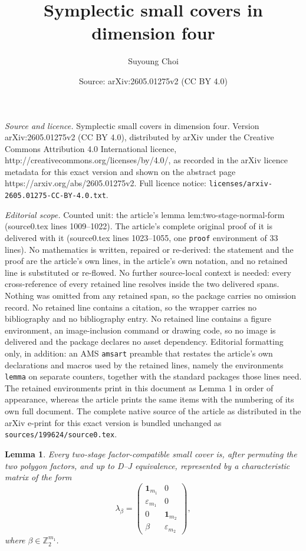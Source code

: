 \documentclass[10pt,a4paper]{amsart}
\title{Symplectic small covers in dimension four}
\author{Suyoung Choi}
\date{Source: arXiv:2605.01275v2 (CC BY 4.0)}
\newtheorem{lemma}{Lemma}
\newcommand{\Z}{\mathbb Z}
\newcommand{\one}{\mathbf 1}
\begin{document}
\maketitle

\noindent\emph{Source and licence.} Symplectic small covers in dimension four. Version arXiv:2605.01275v2 (CC BY 4.0), distributed by arXiv under the Creative Commons Attribution 4.0 International licence, http://creativecommons.org/licenses/by/4.0/, as recorded in the arXiv licence metadata for this exact version and shown on the abstract page https://arxiv.org/abs/2605.01275v2. Full licence notice: \texttt{licenses/arxiv-2605.01275-CC-BY-4.0.txt}.\par\smallskip

\noindent\textit{Editorial scope.} Counted unit: the article's lemma lem:two-stage-normal-form (source0.tex lines 1009--1022). The article's complete original proof of it is delivered with it (source0.tex lines 1023--1055, one \texttt{proof} environment of 33 lines). No mathematics is written, repaired or re-derived: the statement and the proof are the article's own lines, in the article's own notation, and no retained line is substituted or re-flowed.  No further source-local context is needed: every cross-reference of every retained line resolves inside the two delivered spans.  Nothing was omitted from any retained span, so the package carries no omission record.  No retained line contains a citation, so the wrapper carries no bibliography and no bibliography entry.  No retained line contains a figure environment, an image-inclusion command or drawing code, so no image is delivered and the package declares no asset dependency.  Editorial formatting only, in addition: an AMS \texttt{amsart} preamble that restates the article's own declarations and macros used by the retained lines, namely the environments \texttt{lemma} on separate counters, together with the standard packages those lines need.  The retained environments print in this document as Lemma 1 in order of appearance, whereas the article prints the same items with the numbering of its own full document.  The complete native source of the article as distributed in the arXiv e-print for this exact version is bundled unchanged as \texttt{sources/199624/source0.tex}.
\begin{lemma}\label{lem:two-stage-normal-form}
    Every two-stage factor-compatible small cover is, after permuting the two polygon factors, and up to
    D--J equivalence, represented by a characteristic matrix of the form
    \begin{equation}\label{eq:two-stage-normal-form}
        \lambda_\beta=
        \begin{pmatrix}
            \one_{m_1} & 0\\
            \varepsilon_{m_1} & 0\\
            0 & \one_{m_2}\\
            \beta & \varepsilon_{m_2}
        \end{pmatrix},
    \end{equation}
    where $\beta\in \Z_2^{m_1}$.
\end{lemma}
\end{document}
